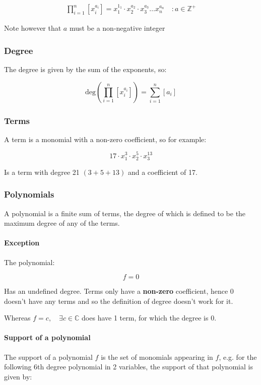\documentclass[a4paper,11pt,twoside]{article}
\begin{document}
\[ 
   \begin{aligned}
   \prod^n_{i=1} \left[ x_i^{a_i} \right] = x_1^{1_1} \cdot x_2^{a_2} \cdot
   x_3^{a_3} \ldots x_n^{a_n} \quad : a \in \mathbb{Z^+}
   \end{aligned}\]

Note however that \(a\) must be a non-negative integer \cite[p. 48]{e.h.connellElementsAbstractLinear2001}
\subsubsection{Degree}
\label{sec:orga195d13}
The degree is given by the sum of the exponents, so:

$$
    \mathrm{deg}\left(   \prod^n_{i=1} \left[ x_i^{a_i} \right]   \right) =
    \sum^{n}_{i= 1}   \left[ a_i \right] 
    $$

\subsubsection{Terms}
\label{sec:orgb84041e}
A term is a monomial with a non-zero coefficient, so for example:

$$
    17 \cdot x_1^3 \cdot x_2^5 \cdot x_3^{13}
    $$

Is a term with degree 21 \((3+5+13)\) and a coefficient of 17.
\subsubsection{Polynomials}
\label{sec:org2429ee0}
A polynomial is a finite sum of terms, the degree of which
is defined to be the maximum degree of any of the terms.

\paragraph{Exception}
\label{sec:org3332be8}
The polynomial:

$$
     f = 0
     $$

Has an undefined degree. Terms only have a \textbf{non-zero} coefficient,
hence \(0\) doesn't have any terms and so the definition of degree
doesn't work for it.

Whereas \(f=c, \quad \exists c \in \mathbb{C}\) does have 1 term,
for which the degree is 0.

\paragraph{Support of a polynomial}
\label{sec:org61c2f60}
The support of a polynomial \(f\) is the set of monomials
appearing in \(f\), e.g. for the following 6th degree polynomial
in 2 variables, the support of that polynomial is given by:
\end{document}
